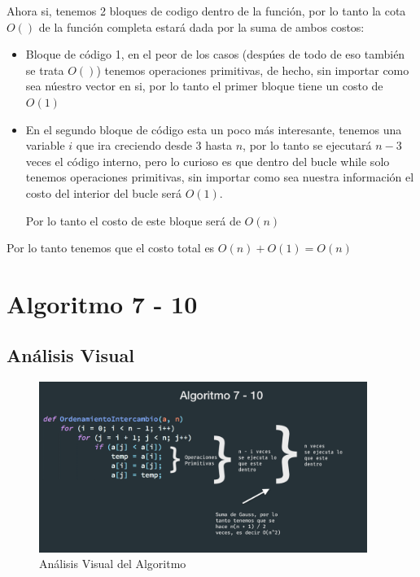 \documentclass[12pt, fleqn]{article}                            %
\theoremstyle{break}                                            %
\begin{document}
        Ahora si, tenemos 2 bloques de codigo dentro de la función, por lo tanto la cota $O()$
        de la función completa estará dada por la suma de ambos costos:
        \begin{itemize}
            \item 
                Bloque de código 1, en el peor de los casos (despúes de todo de eso también se
                trata $O()$) tenemos operaciones primitivas, de hecho, sin importar como sea
                núestro vector en si, por lo tanto el primer bloque tiene un costo de $O(1)$
            \item 
                En el segundo bloque de código esta un poco más interesante, tenemos una variable
                $i$ que ira creciendo desde 3 hasta $n$, por lo tanto se ejecutará $n -3$
                veces el código interno, pero lo curioso es que dentro del bucle while
                solo tenemos operaciones primitivas, sin importar como sea nuestra información
                el costo del interior del bucle será $O(1)$.

                Por lo tanto el costo de este bloque será de $O(n)$
        \end{itemize}

        Por lo tanto tenemos que el costo total es $O(n) + O(1) = O(n)$



\clearpage
\section{Algoritmo 7 - 10}


    \subsection{Análisis Visual}

        \begin{figure}[h]
            \centering
            \includegraphics[width=0.95\textwidth]{Algoritmo7}
            \caption{Análisis Visual del Algoritmo}
        \end{figure}
\end{document}
